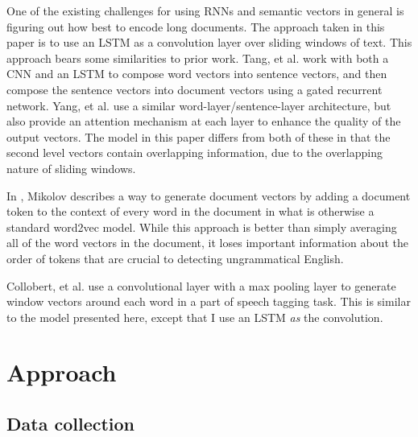\documentclass{article} %
\begin{document}
One of the existing challenges for using RNNs and semantic vectors in general
is figuring out how best to encode long documents. The approach taken in this
paper is to use an LSTM as a convolution layer over sliding windows of text.
This approach bears some similarities to prior work. Tang,
et al. work with both a CNN and an LSTM to compose word vectors into sentence
vectors, and then compose the sentence vectors into document vectors using a
gated recurrent network.\cite{tang} Yang, et al. use a similar
word-layer/sentence-layer architecture, but also provide an attention mechanism
at each layer to enhance the quality of the output vectors.\cite{yang} The model in this
paper differs from both of these in that the second level vectors contain
overlapping information, due to the overlapping nature of sliding windows.

In \cite{mikolov}, Mikolov describes a way to generate
document vectors by adding a document token to the context of every word in the
document in what is otherwise a standard word2vec model. While this approach
is better than simply averaging all of the word vectors in the document, it
loses important information about the order of tokens that are crucial to
detecting ungrammatical English.

Collobert, et al. use
a convolutional layer with a max pooling layer to generate window vectors
around each word in a part of speech tagging task.\cite{collobert} This is similar
to the model presented here, except that I use an LSTM \textit{as} the convolution.


\section{Approach}

\subsection{Data collection}
\end{document}
